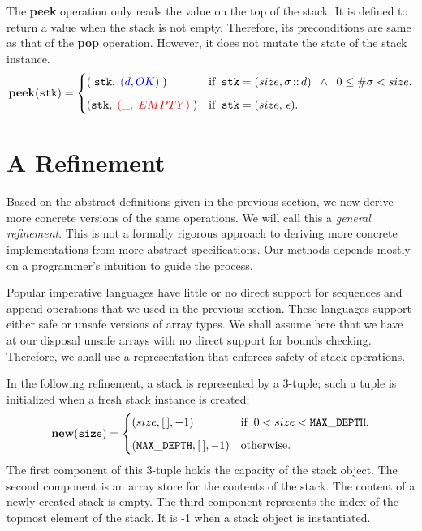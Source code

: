 \documentclass[10pt]{article}
\begin{document}
    The \textbf{peek} operation only reads the value on the top of the stack. It is defined to return a value when the stack is not empty. Therefore, its preconditions are same as that of the \textbf{pop} operation. However, it does not mutate the state of the stack instance.
    \[
        \mathtt{\mathbf{peek}(stk)} = \begin{cases} (\; \mathtt{stk}, \; {\textcolor{blue}{(d, OK)}}\;) & \mbox{if\;\;} \mathtt{stk} = (size, \sigma\,\mathbf{::}\,d) \;\; \wedge\; \; 0 \leq \#\sigma < size. \vspace*{6pt}\\ 
        (\mathtt{stk},\; {\textcolor{red}{(\_,\; EMPTY)}}\;)  & \mbox{if\;\;} \mathtt{stk} = (size,\,\epsilon). \end{cases} 
    \]

  \section{A Refinement}
    Based on the abstract definitions given in the previous section, we now derive more concrete versions of the same operations. We will call this a \emph{general refinement}. This is not a formally rigorous approach to deriving more concrete implementations from more abstract specifications. Our methods depends mostly on a programmer's intuition to guide the process.

    Popular imperative languages have little or no direct support for sequences and append operations that we used in the previous section. These languages support either safe or unsafe versions of array types. We shall assume here that we have at our disposal unsafe arrays with no direct support for bounds checking. Therefore, we shall use a representation that enforces safety of stack operations.

    In the following refinement, a stack is represented by a 3-tuple; such a tuple is initialized when a fresh stack instance is created:
    \[
        \mathtt{\mathbf{new}(size)} = \begin{cases} (size, [\,], -1) &\mbox{if\;\;} 0 < size < \mathtt{MAX\_DEPTH}. \vspace*{6pt}\\ 
        (\mathtt{MAX\_DEPTH}, [\,], -1) & \mbox{otherwise}. \end{cases} 
    \]
    The first component of this 3-tuple holds the capacity of the stack object. The second component is an array store for the contents of the stack. The content of a newly created stack is empty. The third component represents the index of the topmost element of the stack. It is -1 when a stack object is instantiated. 
\end{document}
